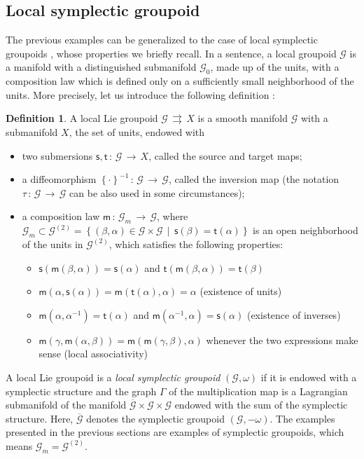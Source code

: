 \documentclass[12pt,a4paper]{article}
\numberwithin{equation}{section}
\theoremstyle{definition}
\newtheorem{definition}[equation]{Definition}
\newcommand{\cG}{\mathcal{G}}
\newcommand{\sfs}{\mathsf{s}}
\newcommand{\sft}{\mathsf{t}}
\newcommand{\sfm}{\mathsf{m}}
\newcommand{\st}{\rightrightarrows}
\begin{document}
\subsection{Local symplectic groupoid}\label{localsympl}
The previous examples can be generalized to the case of local symplectic groupoids \cite{Crainic,cdw-1987}, whose properties we  briefly recall. In a sentence, a local groupoid $\cG$ is a manifold with a distinguished submanifold $\cG_0$, made up of the units, with a composition law which is defined only on a sufficiently small neighborhood of the units. More precisely, let us introduce the following definition \cite{cdw-1987}:
\begin{definition}
A local Lie groupoid $\cG \,\st \, X$ is a smooth manifold $\cG$ with a submanifold $X$, the set of units, endowed with 
\begin{itemize}
\item two submersions $\sfs,\sft\,\colon\, \cG\,\rightarrow \,X$, called the source and target maps;
\item a diffeomorphism $\left\lbrace \cdot \right\rbrace^{-1} \,\colon\,\cG\,\rightarrow\,\cG $, called the inversion map (the notation $\tau\,\colon\,\cG\,\rightarrow\,\cG$ can be also used in some circumstances);
\item a composition law $\sfm\,\colon\, \cG_m \,\rightarrow \, \cG$, where $\cG_m\subset \cG^{(2)}=\left\lbrace (\beta,\alpha)\in \cG\times \cG \,\mid \, \sfs(\beta)=\sft(\alpha) \right\rbrace$ is an open neighborhood of the units in $\cG^{(2)}$, which satisfies the following properties:
\begin{itemize}
\item $\sfs(\sfm(\beta,\alpha))=\sfs(\alpha)$ and $\sft(\sfm(\beta,\alpha))=\sft(\beta)$
\item $\sfm(\alpha,\sfs(\alpha)) = \sfm(\sft(\alpha),\alpha) = \alpha$ (existence of units)
\item $\sfm(\alpha, \alpha^{-1}) = \sft(\alpha)$ and $\sfm(\alpha^{-1},\alpha)=\sfs(\alpha)$ (existence of inverses)
\item $\sfm(\gamma, \sfm(\alpha, \beta)) = \sfm(\sfm(\gamma,\beta),\alpha)$ whenever the two expressions make sense (local associativity)  
\end{itemize}
\end{itemize}
\end{definition} 
A local {Lie} groupoid is a \textit{local symplectic groupoid} $(\cG, \omega)$ if it is endowed with a symplectic structure and the graph $\Gamma$ of the multiplication map is a Lagrangian submanifold of the manifold $\overline{\cG} \times \cG \times \cG $ endowed with the sum of the symplectic structure. Here, $\overline{\cG}$ denotes the symplectic groupoid $(\cG, -\omega)$. The examples presented in the previous sections are examples of symplectic groupoids, which means $\cG_m = \cG^{(2)}$. 
\end{document}
